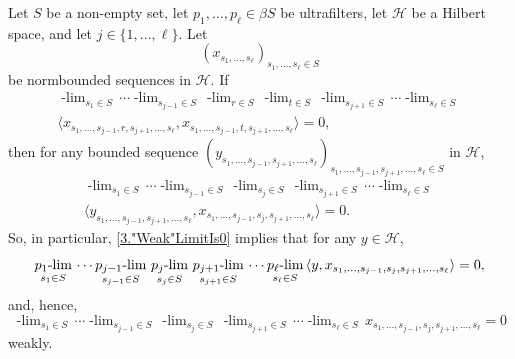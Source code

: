 \documentclass[graybox]{svmult}
\theoremstyle{definition}
\newcommand{\plimgG}[3]{\mathop {#1\text{-lim}}_{#2\in #3}\,}
\begin{document}
\begin{lemma}  \label{3.GeneralVdC}
 Let $S$ be a non-empty set, let $p_1,...,p_\ell\in\beta S$ be ultrafilters, let  $\mathcal H$ be a Hilbert space, and let $j\in\{1,...,\ell\}$. Let
 $$(x_{s_1,...,s_\ell})_{s_1,...,s_\ell\in S}$$
 be norm\text{-}bounded  sequences in $\mathcal H$.
If 
\begin{multline}\label{3.LimitIs0}
\plimgG{p_1}{s_1}{S}\cdots\plimgG{p_{j-1}}{s_{j-1}}{S}\plimgG{p_{j}}{r}{S}\plimgG{p_{j}}{t}{S}\plimgG{p_{j+1}}{s_{j+1}}{S}\cdots\plimgG{p_{\ell}}{s_{\ell}}{S}\\
\langle x_{s_1,...,s_{j-1},r,s_{j+1},...,s_\ell},x_{s_1,...,s_{j-1},t,s_{j+1},...,s_\ell}\rangle=0,
\end{multline}
then for any bounded sequence $(y_{s_1,...,s_{j-1},s_{j+1},...,s_\ell})_{s_1,...,s_{j-1},s_{j+1},...,s_\ell\in S}$ in $\mathcal H$, 
\begin{multline}\label{3."Weak"LimitIs0}
\plimgG{p_1}{s_1}{S}\cdots\plimgG{p_{j-1}}{s_{j-1}}{S}\plimgG{p_{j}}{s_{j}}{S}\plimgG{p_{j+1}}{s_{j+1}}{S}\cdots\plimgG{p_{\ell}}{s_{\ell}}{S}\\
\langle y_{s_1,...,s_{j-1},s_{j+1},...,s_\ell},x_{s_1,...,s_{j-1},s_{j},s_{j+1},...,s_\ell}\rangle=0.
\end{multline}
So, in particular,  \eqref{3."Weak"LimitIs0} implies that for any $y\in \mathcal H$,
$$\plimgG{p_1}{s_1}{S}\cdots\plimgG{p_{j-1}}{s_{j-1}}{S}\plimgG{p_{j}}{s_{j}}{S}\plimgG{p_{j+1}}{s_{j+1}}{S}\cdots\plimgG{p_{\ell}}{s_{\ell}}{S}\\
\langle y, x_{s_1,...,s_{j-1},s_{j},s_{j+1},...,s_\ell}\rangle =0,$$
and, hence, 
$$\plimgG{p_1}{s_1}{S}\cdots\plimgG{p_{j-1}}{s_{j-1}}{S}\plimgG{p_{j}}{s_{j}}{S}\plimgG{p_{j+1}}{s_{j+1}}{S}\cdots\plimgG{p_{\ell}}{s_{\ell}}{S}
 x_{s_1,...,s_{j-1},s_{j},s_{j+1},...,s_\ell}=0$$
 weakly. 
\end{lemma}
\end{document}

